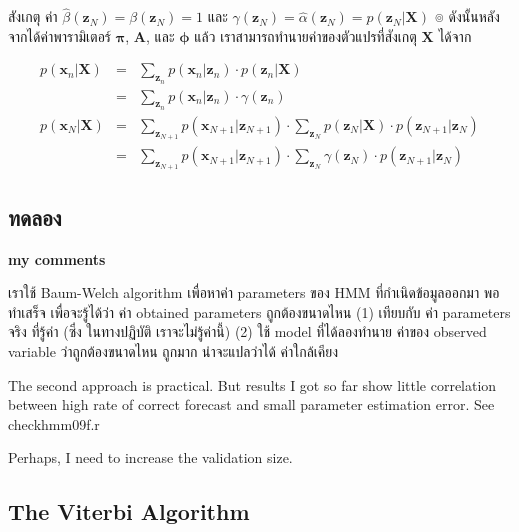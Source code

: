 สังเกตุ ค่า $\hat{\beta}(\textbf{z}_N) = \beta(\textbf{z}_N) = 1$ และ 
$\gamma(\textbf{z}_N) =  \hat{\alpha}(\textbf{z}_N) = p(\textbf{z}_N|\textbf{X})$
๏ ดังนั้นหลังจากได้ค่าพารามิเตอร์ $\bm{\pi}$, $\textbf{A}$, และ $\bm{\phi}$ แล้ว 
เราสามารถทำนายค่าของตัวแปรที่สังเกตุ $\textbf{X}$ ได้จาก

\begin{eqnarray}
p(\textbf{x}_n|\textbf{X}) &=&
\sum_{\textbf{z}_n}
p(\textbf{x}_n|\textbf{z}_n) \cdot p(\textbf{z}_n|\textbf{X})
\nonumber \\
&=& 
\sum_{\textbf{z}_n}
p(\textbf{x}_n|\textbf{z}_n) \cdot \gamma(\textbf{z}_n)
\label{eq: HMM projected x} \\
p(\textbf{x}_N|\textbf{X}) &=& 
\sum_{\textbf{z}_{N+1}}
p(\textbf{x}_{N+1}|\textbf{z}_{N+1}) \cdot \sum_{\textbf{z}_N} p(\textbf{z}_N|\textbf{X}) \cdot p(\textbf{z}_{N+1}|\textbf{z}_N)
\nonumber \\
&=&
\sum_{\textbf{z}_{N+1}}
p(\textbf{x}_{N+1}|\textbf{z}_{N+1}) \cdot \sum_{\textbf{z}_N} \gamma(\textbf{z}_N) \cdot p(\textbf{z}_{N+1}|\textbf{z}_N)
\label{eq: HMM projected x next}
\end{eqnarray}



\subsection{ทดลอง}

\textbf{my comments}

เราใช้ Baum-Welch algorithm เพื่อหาค่า parameters ของ HMM ที่กำเนิดข้อมูลออกมา
พอทำเสร็จ 
เพื่อจะรู้ได้ว่า ค่า obtained parameters ถูกต้องขนาดไหน
(1) เทียบกับ ค่า parameters จริง ที่รู้ค่า (ซึ่ง ในทางปฏิบัติ เราจะไม่รู้ค่านี้)
(2) ใช้ model ที่ได้ลองทำนาย ค่าของ observed variable ว่าถูกต้องขนาดไหน
ถูกมาก น่าจะแปลว่าได้ ค่าใกล้เคียง

The second approach is practical.
But results I got so far show little correlation between high rate of correct forecast and small parameter estimation error.
See checkhmm09f.r

Perhaps, I need to increase the validation size.

\subsection{The Viterbi Algorithm}

